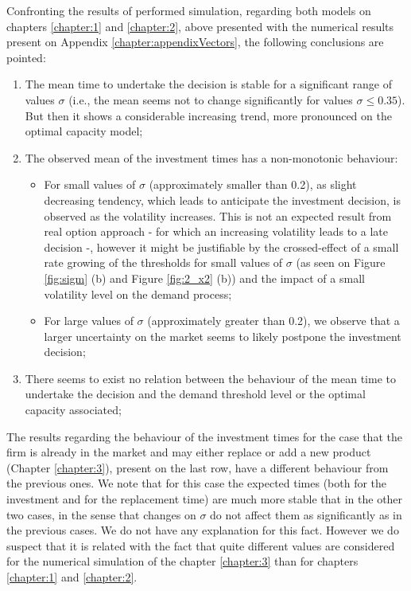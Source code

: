 Confronting the results of performed simulation, regarding both models on chapters \ref{chapter:1} and \ref{chapter:2}, above presented with the numerical results present on Appendix \ref{chapter:appendixVectors}, the following conclusions are pointed:
\begin{enumerate}
	
	
	
	\item The mean time to undertake the decision is stable for a significant range of values $\sigma$ (i.e., the mean seems not to change significantly for values $\sigma \leq 0.35$). But then it shows a considerable increasing trend, more pronounced on the optimal capacity model;
	
	\item  The observed mean of the investment times has a non-monotonic behaviour:
	 \begin{itemize}
	 	\item For small values of $\sigma$ (approximately smaller than 0.2),  as slight decreasing tendency, which leads to anticipate the investment decision, is observed as the volatility increases. This is not an expected result from real option approach - for which an increasing volatility leads to a late decision \cite{dixit:book} -, however it might be justifiable by the crossed-effect of a small rate growing of the thresholds for small values of $\sigma$ (as seen on Figure \ref{fig:sigm} (b) and Figure \ref{fig:2_x2} (b)) and the impact of a small volatility level on the demand process; 
	 	\item For large values of $\sigma$ (approximately greater than 0.2), we observe that a larger uncertainty on the market seems to likely postpone the investment decision;
	 \end{itemize}

	\item There seems to exist no relation between the behaviour of the mean time to undertake the decision and the demand threshold level or the optimal capacity associated;	
	
\end{enumerate}



The results regarding the behaviour of the investment times for the case that the firm is already in the market and may either replace or add a new product (Chapter \ref{chapter:3}), present on the last row, have a different behaviour from the previous ones. We note that for this case the expected times (both for the investment and for the replacement time) are much more stable that in the other two cases, in the sense that changes on $\sigma$ do not affect them as significantly as in the previous cases. We do not have any explanation for this fact. However we do suspect that it is related with the fact that quite different values are considered for the numerical simulation of the chapter \ref{chapter:3} than for chapters \ref{chapter:1} and \ref{chapter:2}.  


